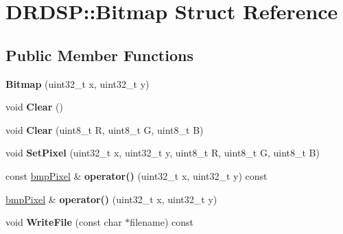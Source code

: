 \hypertarget{struct_d_r_d_s_p_1_1_bitmap}{\section{D\-R\-D\-S\-P\-:\-:Bitmap Struct Reference}
\label{struct_d_r_d_s_p_1_1_bitmap}
}
\subsection*{Public Member Functions}
\begin{DoxyCompactItemize}
\item 
\hypertarget{struct_d_r_d_s_p_1_1_bitmap_aef669ad4b549d745ddbf8c1f2accdfaf}{{\bfseries Bitmap} (uint32\-\_\-t x, uint32\-\_\-t y)}\label{struct_d_r_d_s_p_1_1_bitmap_aef669ad4b549d745ddbf8c1f2accdfaf}

\item 
\hypertarget{struct_d_r_d_s_p_1_1_bitmap_aece2773d4c9cdab4e43aed0535bd7aed}{void {\bfseries Clear} ()}\label{struct_d_r_d_s_p_1_1_bitmap_aece2773d4c9cdab4e43aed0535bd7aed}

\item 
\hypertarget{struct_d_r_d_s_p_1_1_bitmap_ad23a46fe00d18d5c4d7add8d1f8e37f2}{void {\bfseries Clear} (uint8\-\_\-t R, uint8\-\_\-t G, uint8\-\_\-t B)}\label{struct_d_r_d_s_p_1_1_bitmap_ad23a46fe00d18d5c4d7add8d1f8e37f2}

\item 
\hypertarget{struct_d_r_d_s_p_1_1_bitmap_a602b50e770e545ab9aa082abc5e4c235}{void {\bfseries Set\-Pixel} (uint32\-\_\-t x, uint32\-\_\-t y, uint8\-\_\-t R, uint8\-\_\-t G, uint8\-\_\-t B)}\label{struct_d_r_d_s_p_1_1_bitmap_a602b50e770e545ab9aa082abc5e4c235}

\item 
\hypertarget{struct_d_r_d_s_p_1_1_bitmap_ae2c78c108353118df8ce16bf89fb4068}{const \hyperlink{struct_d_r_d_s_p_1_1bmp_pixel}{bmp\-Pixel} \& {\bfseries operator()} (uint32\-\_\-t x, uint32\-\_\-t y) const }\label{struct_d_r_d_s_p_1_1_bitmap_ae2c78c108353118df8ce16bf89fb4068}

\item 
\hypertarget{struct_d_r_d_s_p_1_1_bitmap_a554c5a2e8e954ffe7bfedfae9f6c6493}{\hyperlink{struct_d_r_d_s_p_1_1bmp_pixel}{bmp\-Pixel} \& {\bfseries operator()} (uint32\-\_\-t x, uint32\-\_\-t y)}\label{struct_d_r_d_s_p_1_1_bitmap_a554c5a2e8e954ffe7bfedfae9f6c6493}

\item 
\hypertarget{struct_d_r_d_s_p_1_1_bitmap_ab4641ab3a865fe2c3f4557d66084dd18}{void {\bfseries Write\-File} (const char $\ast$filename) const }\label{struct_d_r_d_s_p_1_1_bitmap_ab4641ab3a865fe2c3f4557d66084dd18}

\end{DoxyCompactItemize}
